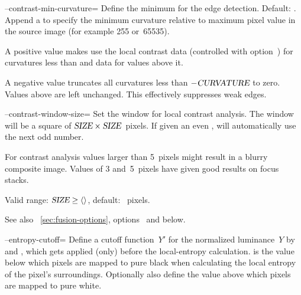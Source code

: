 \begin{codelist}
  \label{opt:contrast-min-curvature}%
\item[--contrast-min-curvature=\metavar{CURVATURE}]\itemend
  Define the minimum  for the  edge detection.  Default:
  .  Append a \sample{\%} to specify the minimum curvature
  relative to maximum pixel value in the source image (for example 255 or~65535).

  A positive value makes \App{} use the local contrast data (controlled with
  option~) for curvatures less than  and
   data for values above it.

  A negative value truncates all curvatures less than $-\textsl{CURVATURE}$ to zero.  Values
  above  are left unchanged.  This effectively suppresses weak edges.


  \label{opt:contrast-window-size}%
\item[--contrast-window-size=\metavar{SIZE}]\itemend
  Set the window  for local contrast analysis.  The window will be a square of
  $\textsl{SIZE} \times \textsl{SIZE}$~pixels.  If given an even , \App{} will
  automatically use the next odd number.

  For contrast analysis  values larger than 5~pixels might result in a blurry
  composite image.  Values of 3 and~5~pixels have given good results on focus stacks.

  Valid range: $\metavar{SIZE} \geq \val{val:minimum-contrast-window-size}$, default:
  ~pixels.

  See also \sectionName~\ref{sec:fusion-options}, options ~and
   below.


  \label{opt:entropy-cutoff}%
\item[--entropy-cutoff=\metavar{LOWER-CUTOFF}\optional{:\metavar{UPPER-CUTOFF}}]\itemend
  Define a cutoff function~$Y'$ for the normalized luminance~$Y$ by  and
  , which gets applied (only) before the local-entropy calculation.
   is the value below which pixels are mapped to pure black when
  calculating the local entropy of the pixel's surroundings.  Optionally also define the
   value above which pixels are mapped to pure white.


\end{codelist}
